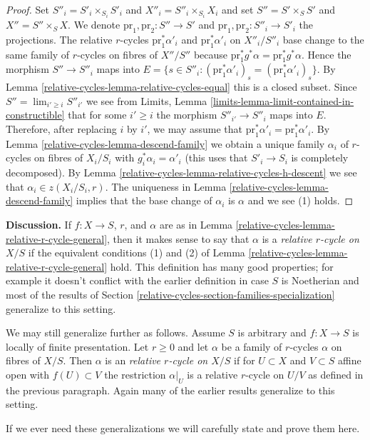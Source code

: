 \begin{proof}
\medskip\noindent
Set $S''_i = S'_i \times_{S_i} S'_i$ and $X''_i = S''_i \times_{S_i} X_i$
and set $S'' = S' \times_S S'$ and $X'' = S'' \times_S X$.
We denote $\text{pr}_1, \text{pr}_2 : S'' \to S'$ and
$\text{pr}_1, \text{pr}_2 : S''_i \to S'_i$ the projections.
The relative $r$-cycles $\text{pr}_1^*\alpha'_i$ and $\text{pr}_1^*\alpha'_i$
on $X''_i/S''_i$ base change to the same family of $r$-cycles
on fibres of $X''/S''$ because
$\text{pr}_1^*g^*\alpha = \text{pr}_1^*g^*\alpha$.
Hence the morphism $S'' \to S''_i$ maps into $E =
\{s \in S''_i : (\text{pr}_1^*\alpha'_i)_s = (\text{pr}_1^*\alpha'_i)_s\}$.
By Lemma \ref{relative-cycles-lemma-relative-cycles-equal} this is a closed subset.
Since $S'' = \lim_{i' \geq i} S''_{i'}$ we see from
Limits, Lemma
\ref{limits-lemma-limit-contained-in-constructible}
that for some $i' \geq i$ the morphism $S''_{i'} \to S''_i$
maps into $E$. Therefore, after replacing $i$ by $i'$, we may assume that
$\text{pr}_1^*\alpha'_i = \text{pr}_1^*\alpha'_i$.
By Lemma \ref{relative-cycles-lemma-descend-family}
we obtain a unique family $\alpha_i$
of $r$-cycles on fibres of $X_i/S_i$
with $g_i^*\alpha_i = \alpha'_i$ (this uses that $S'_i \to S_i$
is completely decomposed).
By Lemma \ref{relative-cycles-lemma-relative-cycles-h-descent}
we see that $\alpha_i \in z(X_i/S_i, r)$.
The uniqueness in Lemma \ref{relative-cycles-lemma-descend-family} implies that the
base change of $\alpha_i$ is $\alpha$ and we see (1) holds.
\end{proof}

{\bf Discussion.}
If $f : X \to S$, $r$, and $\alpha$ are as in
Lemma \ref{relative-cycles-lemma-relative-r-cycle-general}, then it makes sense to
say that $\alpha$ is a {\it relative $r$-cycle on $X/S$} if
the equivalent conditions
(1) and (2) of Lemma \ref{relative-cycles-lemma-relative-r-cycle-general} hold.
This definition has many good properties; for example it
doesn't conflict with the earlier definition in case $S$
is Noetherian and most of the results of
Section \ref{relative-cycles-section-families-specialization} generalize
to this setting.

\medskip\noindent
We may still generalize further as follows.
Assume $S$ is arbitrary and $f : X \to S$ is locally of finite presentation.
Let $r \geq 0$ and let $\alpha$ be a family of $r$-cycles $\alpha$ on fibres of
$X/S$. Then $\alpha$ is an {\it relative $r$-cycle on $X/S$} if
for $U \subset X$ and $V \subset S$ affine open with $f(U) \subset V$
the restriction $\alpha|_U$ is a relative $r$-cycle on $U/V$ as
defined in the previous paragraph. Again many of the earlier results
generalize to this setting.

\medskip\noindent
If we ever need these generalizations we will carefully state and prove
them here.



